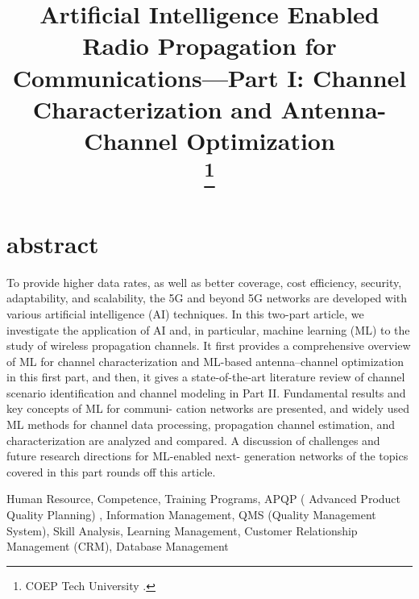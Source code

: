 \documentclass[conference]{IEEEtran}
\begin{document}
\title{Artificial Intelligence Enabled Radio Propagation
for Communications—Part I: Channel
Characterization and Antenna-Channel Optimization\\
\thanks{COEP Tech University .}
}

\author{
\and
{}

 }

\maketitle




\section{abstract}
To provide higher data rates, as well as better
coverage, cost efficiency, security, adaptability, and scalability,
the 5G and beyond 5G networks are developed with various
artificial intelligence (AI) techniques. In this two-part article,
we investigate\cite{w11} the application of AI and, in particular, machine
learning (ML) to the study of wireless propagation channels.
It first provides a comprehensive overview of ML for channel
characterization and ML-based antenna–channel optimization in
this first part, and then, it gives a state-of-the-art literature review
of channel scenario identification and channel modeling in Part
II. Fundamental results and key concepts of ML for communi-
cation networks are presented, and widely used ML methods for
channel data processing, propagation channel estimation, and
characterization are analyzed and compared. A discussion of
challenges and future research directions for ML-enabled next-
generation networks of the topics covered in this part rounds off
this article.




\begin{IEEEkeywords}
Human Resource, Competence, Training Programs, APQP ( Advanced Product Quality 
Planning) , Information Management, QMS (Quality Management System), Skill Analysis, Learning Management, Customer Relationship Management (CRM), Database 
Management
\end{IEEEkeywords}
\end{document}

